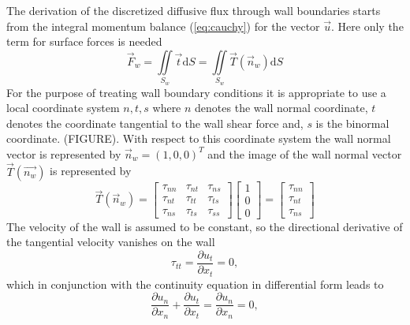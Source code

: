     The derivation of the discretized diffusive flux through wall boundaries starts from the integral momentum balance (\ref{eq:cauchy}) for the vector \(\vec{u}\). Here only the term for surface forces is needed
    \begin{equation}
      \vec{F}_w =  \iint\limits_{S_w} \vec{t} \mathrm{d}S = \iint\limits_{S_w} \vec{T}(\vec{n}_w) \mathrm{d}S 
    \end{equation}
    For the purpose of treating wall boundary conditions it is appropriate to use a local coordinate system \(n,t,s\) where \(n\) denotes the wall normal coordinate, \(t\) denotes the coordinate tangential to the wall shear force and, \(s\) is the binormal coordinate. (FIGURE). With respect to this coordinate system the wall normal vector is represented by \(\vec{n}_w = \left( 1, 0 , 0 \right)^T\) and the image of the wall normal vector \(\vec{T}(\vec{n_w})\) is represented by 
    \begin{displaymath}
    \vec{T}(\vec{n}_w) =
    \left[
      \begin{array}{ccc}
        \tau_{nn} & \tau_{nt} & \tau_{ns}\\
        \tau_{nt} & \tau_{tt} & \tau_{ts}\\
        \tau_{ns} & \tau_{ts} & \tau_{ss}
      \end{array}
    \right]
    \left[
    \begin{array}{c}
      1\\
      0\\
      0
    \end{array}
    \right]
    =
    \left[
    \begin{array}{c}
      \tau_{nn}\\
      \tau_{nt}\\
      \tau_{ns}
    \end{array}
    \right]
    \end{displaymath}
    The velocity of the wall is assumed to be constant, so the directional derivative of the tangential velocity vanishes on the wall
    \begin{displaymath}
      \tau_{tt} =  \frac{ \partial u_t }{ \partial x_t }  =  0,
    \end{displaymath}
    which in conjunction with the continuity equation in differential form leads to
    \begin{displaymath}
     \frac{ \partial u_n }{ \partial x_n } + \frac{ \partial u_t }{ \partial x_t } =  \frac{ \partial u_n }{ \partial x_n } = 0,
    \end{displaymath}
